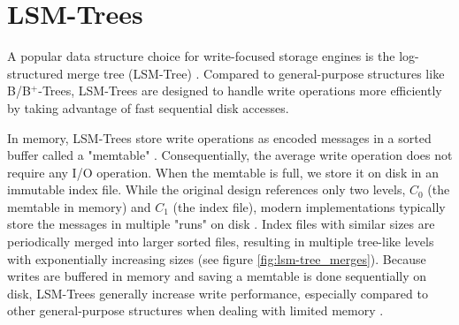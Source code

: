 \section{LSM-Trees}

A popular data structure choice for write-focused storage engines is the log-structured merge tree (LSM-Tree) \cite{lsm_tree}. Compared to general-purpose structures like B/B$^+$-Trees, LSM-Trees are designed to handle write operations more efficiently by taking advantage of fast sequential disk accesses.

In memory, LSM-Trees store write operations as encoded messages in a sorted buffer called a "memtable" \cite{lsm_tree}. Consequentially, the average write operation does not require any I/O operation. When the memtable is full, we store it on disk in an immutable index file. While the original design \cite{lsm_tree} references only two levels, $C_0$ (the memtable in memory) and $C_1$ (the index file), modern implementations typically store the messages in multiple "runs" on disk \cite{lsm_b_tree}. Index files with similar sizes are periodically merged into larger sorted files, resulting in multiple tree-like levels with exponentially increasing sizes (see figure \ref{fig:lsm-tree_merges}).\newline
Because writes are buffered in memory and saving a memtable is done sequentially on disk, LSM-Trees generally increase write performance, especially compared to other general-purpose structures when dealing with limited memory \cite{lsm_tree, lsm_b_tree}.


